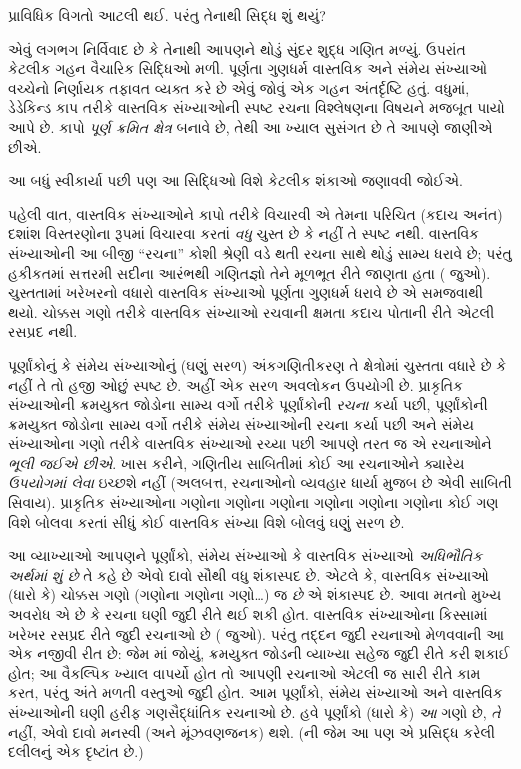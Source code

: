 \label{guunit:OLP-0046}


પ્રાવિધિક વિગતો આટલી થઈ. પરંતુ તેનાથી સિદ્ધ શું થયું?

એવું લગભગ નિર્વિવાદ છે કે તેનાથી આપણને થોડું {સુંદર} શુદ્ધ ગણિત
મળ્યું. ઉપરાંત કેટલીક ગહન વૈચારિક સિદ્ધિઓ મળી. પૂર્ણતા ગુણધર્મ
વાસ્તવિક અને સંમેય સંખ્યાઓ વચ્ચેનો નિર્ણાયક તફાવત વ્યક્ત કરે છે એવું
જોવું એક ગહન અંતર્દૃષ્ટિ હતું. વધુમાં, ડેડેકિન્ડ કાપ તરીકે વાસ્તવિક
સંખ્યાઓની સ્પષ્ટ રચના વિશ્લેષણના વિષયને મજબૂત પાયો આપે છે. કાપો
\emph{પૂર્ણ ક્રમિત ક્ષેત્ર} બનાવે છે, તેથી આ ખ્યાલ સુસંગત છે તે આપણે જાણીએ છીએ.

આ બધું સ્વીકાર્યા પછી પણ આ સિદ્ધિઓ વિશે કેટલીક શંકાઓ જણાવવી જોઈએ.

પહેલી વાત, વાસ્તવિક સંખ્યાઓને કાપો તરીકે વિચારવી એ તેમના પરિચિત
(કદાચ અનંત) દશાંશ વિસ્તરણોના રૂપમાં વિચારવા કરતાં \emph{વધુ} ચુસ્ત
છે કે નહીં તે સ્પષ્ટ નથી. વાસ્તવિક સંખ્યાઓની આ બીજી ``રચના'' કોશી
શ્રેણી વડે થતી રચના સાથે થોડું સામ્ય ધરાવે છે; પરંતુ હકીકતમાં
સત્તરમી સદીના આરંભથી ગણિતજ્ઞો તેને મૂળભૂત રીતે જાણતા હતા
( જુઓ). ચુસ્તતામાં ખરેખરનો વધારો વાસ્તવિક સંખ્યાઓ
પૂર્ણતા ગુણધર્મ ધરાવે છે એ સમજવાથી થયો. ચોક્કસ ગણો તરીકે વાસ્તવિક
સંખ્યાઓ રચવાની ક્ષમતા કદાચ પોતાની રીતે એટલી રસપ્રદ નથી.

પૂર્ણાંકોનું કે સંમેય સંખ્યાઓનું (ઘણું સરળ) અંકગણિતીકરણ તે ક્ષેત્રોમાં
ચુસ્તતા વધારે છે કે નહીં તે તો હજી ઓછું સ્પષ્ટ છે. અહીં એક સરળ અવલોકન
ઉપયોગી છે. પ્રાકૃતિક સંખ્યાઓની ક્રમયુક્ત જોડોના સામ્ય વર્ગો તરીકે
પૂર્ણાંકોની \emph{રચના} કર્યા પછી, પૂર્ણાંકોની ક્રમયુક્ત જોડોના સામ્ય
વર્ગો તરીકે સંમેય સંખ્યાઓની રચના કર્યા પછી અને સંમેય સંખ્યાઓના ગણો
તરીકે વાસ્તવિક સંખ્યાઓ રચ્યા પછી આપણે તરત જ એ રચનાઓને \emph{ભૂલી
જઈએ છીએ}. ખાસ કરીને, ગણિતીય સાબિતીમાં કોઈ આ રચનાઓને ક્યારેય
\emph{ઉપયોગમાં લેવા} ઇચ્છશે નહીં (અલબત્ત, રચનાઓનો વ્યવહાર ધાર્યા મુજબ
છે એવી સાબિતી સિવાય). પ્રાકૃતિક સંખ્યાઓના ગણોના ગણોના ગણોના ગણોના
ગણોના ગણોના કોઈ ગણ વિશે બોલવા કરતાં સીધું કોઈ વાસ્તવિક સંખ્યા વિશે
બોલવું ઘણું સરળ છે.

આ વ્યાખ્યાઓ આપણને પૂર્ણાંકો, સંમેય સંખ્યાઓ કે વાસ્તવિક સંખ્યાઓ
\emph{અધિભૌતિક અર્થમાં શું છે} તે કહે છે એવો દાવો સૌથી વધુ
શંકાસ્પદ છે. એટલે કે, વાસ્તવિક સંખ્યાઓ (ધારો કે) ચોક્કસ ગણો
(ગણોના ગણોના ગણો\ldots) જ \emph{છે} એ શંકાસ્પદ છે. આવા મતનો મુખ્ય
અવરોધ એ છે કે રચના ઘણી જુદી રીતે થઈ શકી હોત. વાસ્તવિક સંખ્યાઓના
કિસ્સામાં ખરેખર રસપ્રદ રીતે જુદી રચનાઓ છે ( જુઓ).
પરંતુ તદ્દન જુદી રચનાઓ મેળવવાની આ એક નજીવી રીત છે: જેમ
માં જોયું, ક્રમયુક્ત જોડની વ્યાખ્યા સહેજ જુદી
રીતે કરી શકાઈ હોત; આ વૈકલ્પિક ખ્યાલ વાપર્યો હોત તો આપણી રચનાઓ એટલી
જ સારી રીતે કામ કરત, પરંતુ અંતે મળતી વસ્તુઓ જુદી હોત. આમ પૂર્ણાંકો,
સંમેય સંખ્યાઓ અને વાસ્તવિક સંખ્યાઓની ઘણી હરીફ ગણસૈદ્ધાંતિક રચનાઓ છે.
હવે પૂર્ણાંકો (ધારો કે) \emph{આ} ગણો છે, \emph{તે} નહીં, એવો દાવો
મનસ્વી (અને મૂંઝવણજનક) થશે. (ની જેમ આ પણ
\citealt{Benacerraf1965}એ પ્રસિદ્ધ કરેલી દલીલનું એક દૃષ્ટાંત છે.)

